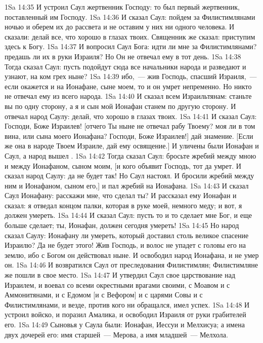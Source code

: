 \vs 1Sa 14:35 И устроил Саул жертвенник Господу: то был первый жертвенник, поставленный им Господу.
\vs 1Sa 14:36 И сказал Саул: пойдем  за Филистимлянами ночью и оберем их до рассвета и не оставим у них ни одного человека. И сказали: делай все, что хорошо в глазах твоих. Священник же сказал: приступим здесь к Богу.
\vs 1Sa 14:37 И вопросил Саул Бога: идти ли мне  за Филистимлянами? предашь ли их в руки Израиля? Но Он не отвечал ему в тот день.
\vs 1Sa 14:38 Тогда сказал Саул: пусть подойдут сюда все начальники народа и разведают и узнают, на ком грех ныне?
\vs 1Sa 14:39 ибо,~--- жив Господь, спасший Израиля,~--- если окажется и на Ионафане, сыне моем, то и он умрет непременно. Но никто не отвечал ему из всего народа.
\vs 1Sa 14:40 И сказал  всем Израильтянам: станьте вы по одну сторону, а я и сын мой Ионафан станем по другую сторону. И отвечал народ Саулу: делай, что хорошо в глазах твоих.
\vs 1Sa 14:41 И сказал Саул: Господи, Боже Израилев! [отчего Ты ныне не отвечал рабу Твоему? моя ли в том вина, или сына моего Ионафана? Господи, Боже Израилев!] дай знамение. [Если же она в народе Твоем Израиле, дай ему освящение.] И уличены были Ионафан и Саул, а народ вышел .
\vs 1Sa 14:42 Тогда сказал Саул: бросьте жребий между мною и между Ионафаном, сыном моим, [и кого объявит Господь, тот да умрет. И сказал народ Саулу: да не будет так! Но Саул настоял. И бросили жребий между ним и Ионафаном, сыном его,] и пал жребий на Ионафана.
\vs 1Sa 14:43 И сказал Саул Ионафану: расскажи мне, что сделал ты? И рассказал ему Ионафан и сказал: я отведал концом палки, которая в руке моей, немного меду; и вот, я должен умереть.
\vs 1Sa 14:44 И сказал Саул: пусть то и то сделает мне Бог, и еще больше сделает; ты, Ионафан, должен сегодня умереть!
\vs 1Sa 14:45 Но народ сказал Саулу: Ионафану ли умереть, который доставил столь великое спасение Израилю? Да не будет этого! Жив Господь, и волос не упадет с головы его на землю, ибо с Богом он действовал ныне. И освободил народ Ионафана, и не умер он.
\vs 1Sa 14:46 И возвратился Саул от преследования Филистимлян; Филистимляне же пошли в свое место.
\rsbpar\vs 1Sa 14:47 И утвердил Саул свое царствование над Израилем, и воевал со всеми окрестными врагами своими, с Моавом и с Аммонитянами, и с Едомом [и с Вефором] и с царями Совы и с Филистимлянами, и везде, против кого ни обращался, имел успех.
\vs 1Sa 14:48 И устроил войско, и поразил Амалика, и освободил Израиля от руки грабителей его.
\vs 1Sa 14:49 Сыновья у Саула были: Ионафан, Иессуи и Мелхисуа; а имена двух дочерей его: имя старшей~--- Мерова, а имя младшей~--- Мелхола.
